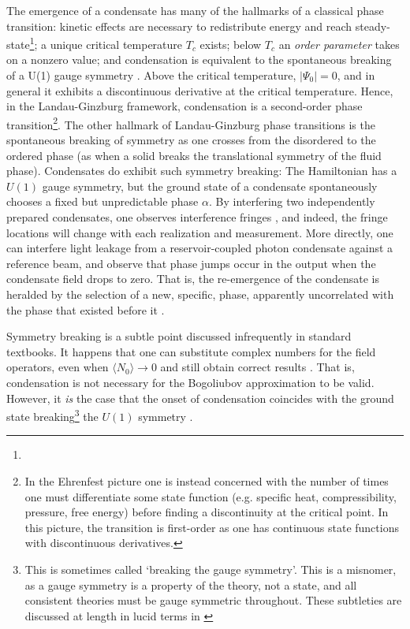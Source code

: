 	The emergence of a condensate has many of the hallmarks of a classical phase transition: kinetic effects are necessary to redistribute energy and reach steady-state\footnote{}; a unique critical temperature $T_c$ exists; below $T_c$ an \emph{order parameter} takes on a nonzero value; and condensation is equivalent to the spontaneous breaking of a U(1) gauge symmetry \cite{yukalov11_symmetry}.
	Above the critical temperature, $|\Psi_0|=0$, and in general it exhibits a discontinuous derivative at the critical temperature.
	Hence, in the Landau-Ginzburg framework, condensation is a second-order phase transition\footnote{In the Ehrenfest picture one is instead concerned with the number of times one must differentiate some state function (e.g.
	specific heat, compressibility, pressure, free energy) before finding a discontinuity at the critical point.
	In this picture, the transition is first-order as one has continuous state functions with discontinuous derivatives.}.
	The other hallmark of Landau-Ginzburg phase transitions is the spontaneous breaking of symmetry as one crosses from the disordered to the ordered phase (as when a solid breaks the translational symmetry of the fluid phase).
	Condensates do exhibit such symmetry breaking: The Hamiltonian has a $U(1)$ gauge symmetry, but the ground state of a condensate spontaneously chooses a fixed but unpredictable phase $\alpha$.
	By interfering two independently prepared condensates, one observes interference fringes \cite{andrews97}, and indeed, the fringe locations will change with each realization and measurement.
	More directly, one can interfere light leakage from a reservoir-coupled photon condensate against a reference beam, and observe that phase jumps occur in the output when the condensate field drops to zero.
	That is, the re-emergence of the condensate is heralded by the selection of a new, specific, phase, apparently uncorrelated with the phase that existed before it \cite{schmitt16}.
	
	
	Symmetry breaking is a subtle point discussed infrequently in standard textbooks.
	It happens that one can substitute complex numbers for the field operators,  even when $\langle N_0\rangle \rightarrow 0$ and still obtain correct results \cite{ginibre67}.
	That is, condensation is not necessary for the Bogoliubov approximation to be valid.
	However, it \emph{is} the case that the onset of condensation coincides with the ground state breaking\footnote{This is sometimes called `breaking the gauge symmetry'.
	This is a misnomer, as a gauge symmetry is a property of the theory, not a state, and all consistent theories must be gauge symmetric throughout.
	These subtleties are discussed at length in lucid terms in \cite{poniatowski19}} the $U(1)$ symmetry \cite{suto05} .
	
